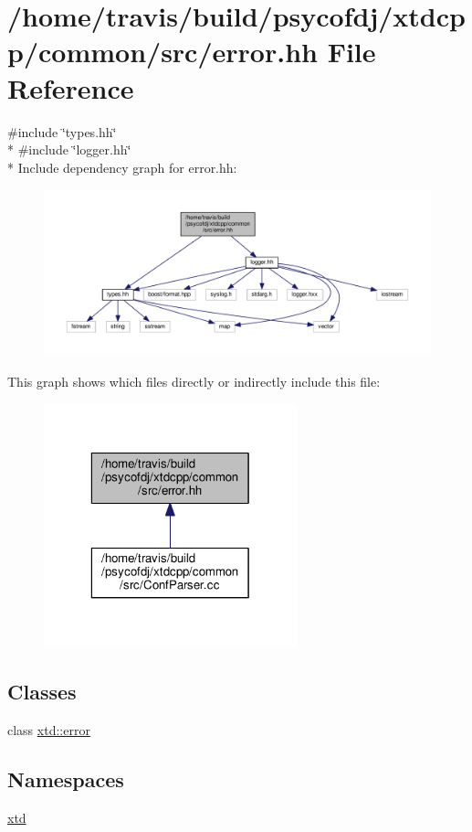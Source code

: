 \hypertarget{error_8hh}{\section{/home/travis/build/psycofdj/xtdcpp/common/src/error.hh File Reference}
\label{error_8hh}
}
{\ttfamily \#include \char`\"{}types.\-hh\char`\"{}}\\*
{\ttfamily \#include \char`\"{}logger.\-hh\char`\"{}}\\*
Include dependency graph for error.\-hh\-:
\nopagebreak
\begin{figure}[H]
\begin{center}
\leavevmode
\includegraphics[width=350pt]{error_8hh__incl}
\end{center}
\end{figure}
This graph shows which files directly or indirectly include this file\-:
\nopagebreak
\begin{figure}[H]
\begin{center}
\leavevmode
\includegraphics[width=208pt]{error_8hh__dep__incl}
\end{center}
\end{figure}
\subsection*{Classes}
\begin{DoxyCompactItemize}
\item 
class \hyperlink{classxtd_1_1error}{xtd\-::error}
\end{DoxyCompactItemize}
\subsection*{Namespaces}
\begin{DoxyCompactItemize}
\item 
\hyperlink{namespacextd}{xtd}
\end{DoxyCompactItemize}
